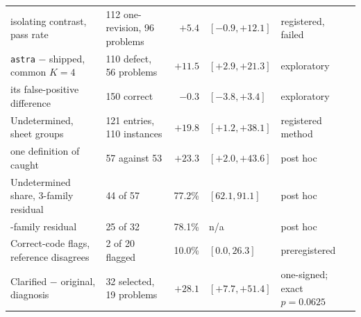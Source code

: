 \begin{table}[t]
\begin{tabular}{@{}llrll@{}}
\quad isolating contrast, pass rate & 112 one-revision, 96 problems & $+5.4$ & $[-0.9, +12.1]$ & registered, failed \\
\texttt{astra} $-$ shipped, common $K=4$ & 110 defect, 56 problems & $+11.5$ & $[+2.9, +21.3]$ & exploratory \\
\quad its false-positive difference & 150 correct & $-0.3$ & $[-3.8, +3.4]$ & exploratory \\
Undetermined, sheet groups & 121 entries, 110 instances & $+19.8$ & $[+1.2, +38.1]$ & registered method \\
\quad one definition of caught & 57 against 53 & $+23.3$ & $[+2.0, +43.6]$ & post hoc \\
Undetermined share, 3-family residual & 44 of 57 & 77.2\% & $[62.1, 91.1]$ & post hoc \\
\quad 6-family residual & 25 of 32 & 78.1\% & n/a & post hoc \\
Correct-code flags, reference disagrees & 2 of 20 flagged & 10.0\% & $[0.0, 26.3]$ & preregistered \\
Clarified $-$ original, diagnosis & 32 selected, 19 problems & $+28.1$ & $[+7.7, +51.4]$ & one-signed; exact $p = 0.0625$ \\
\bottomrule
\end{tabular}
\end{table}

